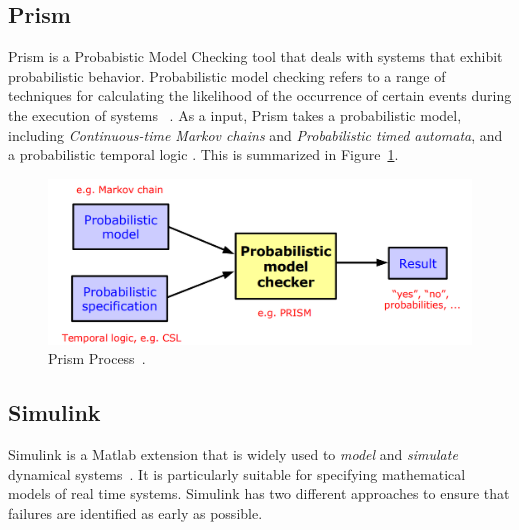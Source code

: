 \paragraph{}

\subsection*{Prism}

Prism is a Probabistic Model Checking tool that deals with systems that exhibit probabilistic behavior. Probabilistic model checking refers to a range of techniques for calculating the likelihood of the occurrence of certain events during the execution of systems ~\cite{prism}. As a input, Prism takes a probabilistic model, including \emph{Continuous-time Markov chains} and \emph{Probabilistic timed automata}, and a probabilistic temporal logic \cite{citacao6}. This is summarized in Figure~\ref{fig:prism}.

\begin{figure} [H]
    \centering
    \includegraphics[width=0.9\linewidth]{chapters/Prism.png}
    \caption[Prism Process]{Prism Process~\cite{prism}.}
    \label{fig:prism}
\end{figure}

\paragraph{}

\subsection*{Simulink}

Simulink is a Matlab extension %
that is widely used to \emph{model} and \emph{simulate} dynamical systems~\cite{Peled2001}. It is particularly suitable for specifying mathematical models of real time systems. Simulink has two different approaches to ensure that failures are identified as early as possible.

